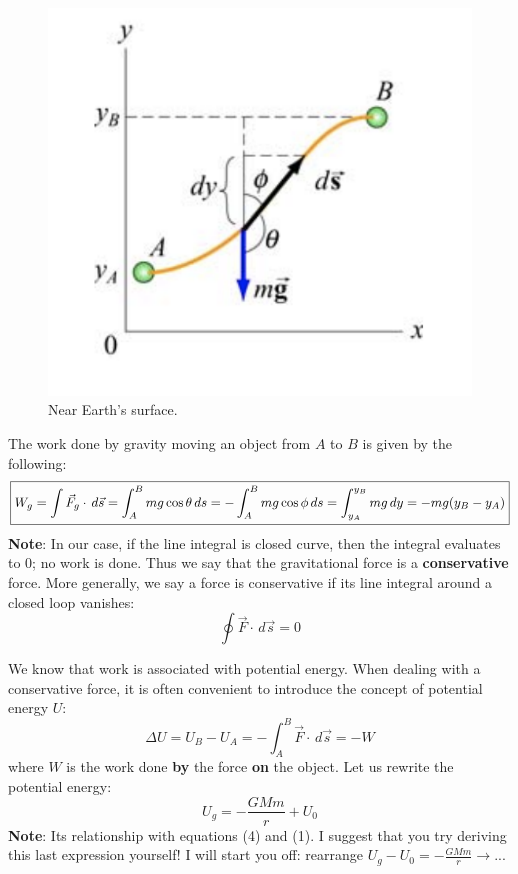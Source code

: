 \documentclass[11pt, letterpaper]{article}
\begin{document}
	\begin{figure}[h!]
		\centering
		\includegraphics[scale=0.5]{earth_surface}
		\caption{Near Earth's surface.}
	\end{figure}		
	\noindent The work done by gravity moving an object from $A$ to $B$ is given by the following:
	\begin{equation}\label{eqn:work-2}
		\centering
		\boxed{W_g = \int \vec{F}_g\cdot \, d\vec{s} = \int_A^B mg\cos\theta\, ds = -\int_A^B mg\cos
		\phi\, ds = \int_{y_A}^{y_B} mg\, dy = -mg(y_B - y_A)}
	\end{equation}
	\textbf{Note}: In our case, if the line integral is closed curve, then the integral evaluates to $0$;
	no work is done. Thus we say that the gravitational force is a \textbf{conservative} force. More
	generally, we say a force is conservative if its line integral around a closed loop vanishes:
	\begin{equation}\label{eqn:cauchy}
		\boxed{\oint\vec{F}\cdot\, d\vec{s} = 0}
	\end{equation}
	
	We know that work is associated with potential energy. When dealing with a conservative force, 
	it is often convenient to introduce the concept of potential energy $U$:
	\begin{equation}\label{eqn:potential-energy}
		\boxed{\Delta U = U_B - U_A = -\int_A^B \vec{F}\cdot\, d\vec{s} = -W}
	\end{equation}
	where $W$ is the work done \textbf{by} the force \textbf{on} the object. Let us rewrite the
	potential energy: \[U_g = -\frac{GMm}{r} + U_0\] \textbf{Note}: Its relationship with equations (4)
	and (1). I suggest that you try deriving this last expression yourself! I will start you off:
	rearrange $U_g - U_0 = -\frac{GMm}{r} \rightarrow ...$
	
\end{document}
